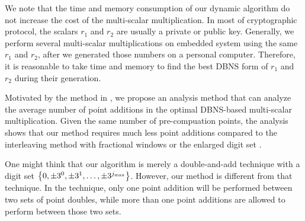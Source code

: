 We note that the time and memory consumption of our dynamic algorithm do not increase the cost of the multi-scalar multiplication. In most of cryptographic protocol, the scalars $r_1$ and $r_2$ are usually a private or public key. Generally, we perform several multi-scalar multiplications on embedded system using the same $r_1$ and $r_2$, after we generated those numbers on a personal computer. Therefore, it is reasonable to take time and memory to find the best DBNS form of $r_1$ and $r_2$ during their generation.

Motivated by the method in \cite{analysisMethod}, we propose an analysis method that can analyze the average number of point additions in the optimal DBNS-based multi-scalar multiplication. Given the same number of pre-compuation points, the analysis shows that our method requires much less point additions compared to the interleaving method with fractional windows \cite{fractional} or the enlarged digit set \cite{analysisMethod}.

One might think that our algorithm is merely a double-and-add technique with a digit set $\left\{0, \pm 3^0, \pm 3^1, \dots, \pm 3^{j_{\rm max}} \right\}$. However, our method is different from that technique. In the technique, only one point addition will be performed between two sets of point doubles, while more than one point additions are allowed to perform between those two sets.
